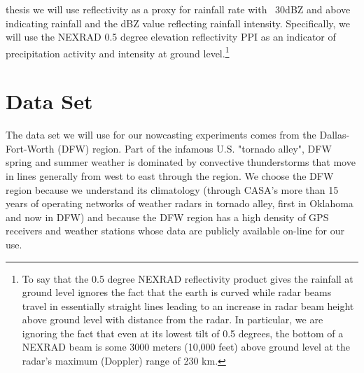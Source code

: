 \documentclass[proposal]{umassthesis}
\begin{document}
 thesis we will use reflectivity as a proxy for rainfall rate
 with ~30dBZ and above indicating rainfall and the dBZ value reflecting
 rainfall intensity.
 Specifically, we will use the NEXRAD 0.5 degree elevation reflectivity PPI
 as an indicator of precipitation activity and intensity at ground level.\footnote{To say that the 0.5 degree NEXRAD reflectivity product gives the rainfall at ground level ignores the fact that the earth is
 curved while radar beams travel in essentially straight lines leading
 to an increase in radar beam height above ground level with distance from
 the radar. In particular, we are ignoring the fact that even at its
 lowest tilt of 0.5 degrees, the bottom of a NEXRAD beam is some 3000
 meters (10,000 feet) above ground level at the radar's maximum (Doppler)
 range of 230 km.}

\chapter{Data Set}

The data set we will use for our nowcasting experiments comes from the Dallas-Fort-Worth (DFW) region. Part of the infamous U.S. "tornado alley", DFW spring and summer weather is dominated by convective thunderstorms that move in lines generally from west to east through the region. We choose the DFW region because we understand its climatology (through CASA's more than 15 years of operating networks of weather radars in tornado alley, first in Oklahoma and now in DFW) and because the DFW region has a high density of GPS receivers and weather stations whose data are publicly available on-line for our use.
\end{document}
